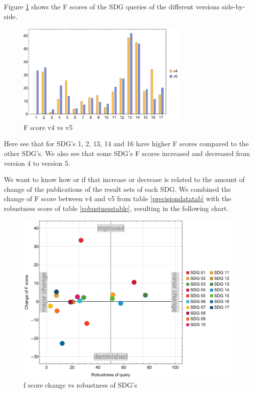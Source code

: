 \documentclass{article}
\begin{document}
Figure \ref{f1barchart} shows the F scores of the SDG queries of the different versions side-by-side. 
\begin{figure}[H]
	\centering
  \includegraphics[width=0.75\textwidth]{figures/f1barchart.pdf}
	\caption{F score v4 vs v5}
	\label{f1barchart}
\end{figure}

Here see that for SDG's 1, 2, 13, 14 and 16 have higher F scores compared to the other SDG's. We also see that some SDG's F scores increased and decreased from version 4 to version 5.

We want to know how or if that increase or decrease is related to the amount of change of the publications of the result sets of each SDG. We combined the change of F score between v4 and v5 from table \ref{precisiondatatab} with the robustness score of table \ref{robustnesstable}, resulting in the following chart. 

\begin{figure}[H]
	\centering
  \includegraphics[width=\textwidth]{figures/scatterplot1-fscore-robustness.pdf}
	\caption{f score change vs robustness of SDG's}
	\label{fscore-vs-robustnes}
\end{figure}
\end{document}
